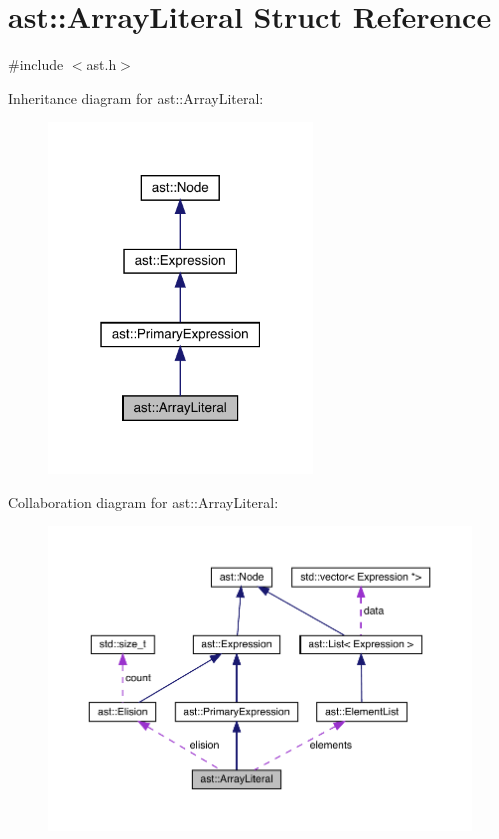 \hypertarget{structast_1_1_array_literal}{}\section{ast\+:\+:Array\+Literal Struct Reference}
\label{structast_1_1_array_literal}


{\ttfamily \#include $<$ast.\+h$>$}



Inheritance diagram for ast\+:\+:Array\+Literal\+:\nopagebreak
\begin{figure}[H]
\begin{center}
\leavevmode
\includegraphics[width=199pt]{structast_1_1_array_literal__inherit__graph}
\end{center}
\end{figure}


Collaboration diagram for ast\+:\+:Array\+Literal\+:\nopagebreak
\begin{figure}[H]
\begin{center}
\leavevmode
\includegraphics[width=350pt]{structast_1_1_array_literal__coll__graph}
\end{center}
\end{figure}
